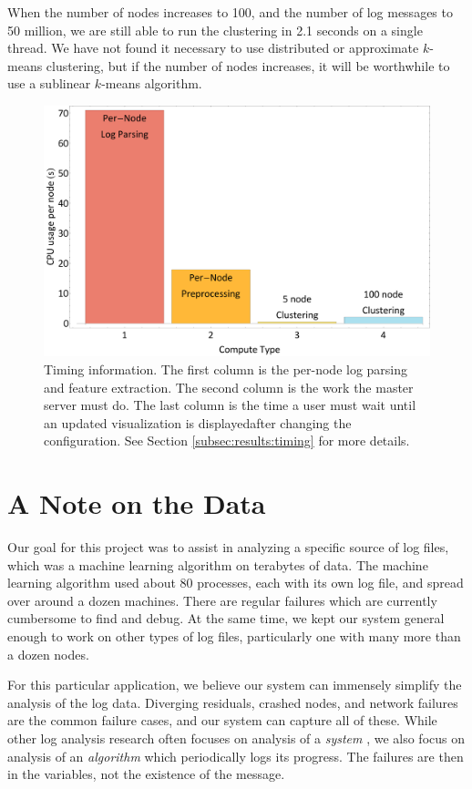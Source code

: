\documentclass[conference]{style/acmsiggraph}
\begin{document}
When the number of nodes increases to 100, and the number of log messages to 50 million, we are still able to run the clustering in 2.1 seconds on a single thread.
We have not found it necessary to use distributed or approximate $k$-means clustering, but if the number of nodes increases, it will be worthwhile to use a sublinear $k$-means algorithm.

\begin{figure}[t]
    \centering
    \includegraphics[width=1.0\columnwidth]{images/timing.pdf}
    \caption{Timing information. The first column is the per-node log parsing and feature extraction. The second column is the work the master server must do. The last column is the time a user must wait until an updated visualization is displayedafter changing the configuration. See Section \ref{subsec:results:timing} for more details.}
    \label{fig:timings}
\end{figure}

\section{A Note on the Data}

Our goal for this project was to assist in analyzing a specific source of log files, which was a machine learning algorithm on terabytes of data.
The machine learning algorithm used about 80 processes, each with its own log file, and spread over around a dozen machines.
There are regular failures which are currently cumbersome to find and debug.
At the same time, we kept our system general enough to work on other types of log files, particularly one with many more than a dozen nodes.

For this particular application, we believe our system can immensely simplify the analysis of the log data.
Diverging residuals, crashed nodes, and network failures are the common failure cases, and our system can capture all of these.
While other log analysis research often focuses on analysis of a \emph{system} \cite{XuOSP,Xu09}, we also focus on analysis of an \emph{algorithm} which periodically logs its progress.
The failures are then in the variables, not the existence of the message.
\end{document}
